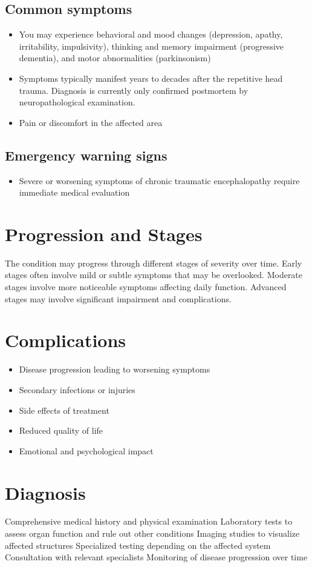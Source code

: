 \subsection{Common symptoms}
\begin{itemize}[noitemsep]
  \item You may experience behavioral and mood changes (depression, apathy, irritability, impulsivity), thinking and memory impairment (progressive dementia), and motor abnormalities (parkinsonism)
  \item Symptoms typically manifest years to decades after the repetitive head trauma. Diagnosis is currently only confirmed postmortem by neuropathological examination.
  \item Pain or discomfort in the affected area
  \end{itemize}

\subsection{Emergency warning signs}
\begin{itemize}[noitemsep]
  \item Severe or worsening symptoms of chronic traumatic encephalopathy require immediate medical evaluation
\end{itemize}
\section{Progression and Stages}
The condition may progress through different stages of severity over time. Early stages often involve mild or subtle symptoms that may be overlooked. Moderate stages involve more noticeable symptoms affecting daily function. Advanced stages may involve significant impairment and complications.
\section{Complications}
\begin{itemize}[noitemsep]
  \item Disease progression leading to worsening symptoms
  \item Secondary infections or injuries
  \item Side effects of treatment
  \item Reduced quality of life
  \item Emotional and psychological impact
\end{itemize}
\section{Diagnosis}
Comprehensive medical history and physical examination Laboratory tests to assess organ function and rule out other conditions Imaging studies to visualize affected structures Specialized testing depending on the affected system Consultation with relevant specialists Monitoring of disease progression over time

